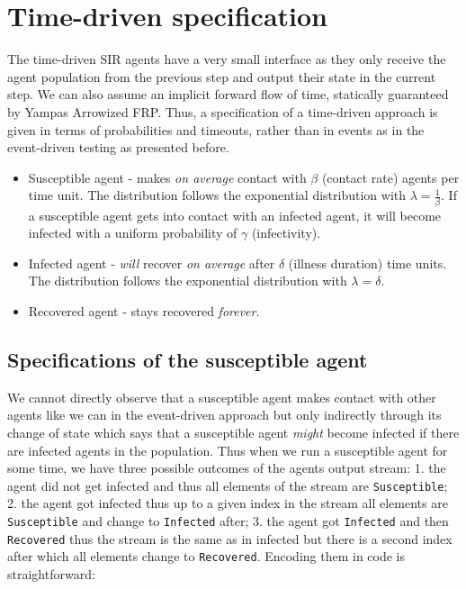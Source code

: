 \section{Time-driven specification}
\label{sec:timedriven_specification}
The time-driven SIR agents have a very small interface as they only receive the agent population from the previous step and output their state in the current step. We can also assume an implicit forward flow of time, statically guaranteed by Yampas Arrowized FRP. Thus, a specification of a time-driven approach is given in terms of probabilities and timeouts, rather than in events as in the event-driven testing as presented before.

\begin{itemize}
	\item Susceptible agent - makes \textit{on average} contact with $\beta$ (contact rate) agents per time unit. The distribution follows the exponential distribution with $\lambda = \frac{1}{\beta}$. If a susceptible agent gets into contact with an infected agent, it will become infected with a uniform probability of $\gamma$ (infectivity).
	
	\item Infected agent - \textit{will} recover \textit{on average} after $\delta$ (illness duration) time units. The distribution follows the exponential distribution with $\lambda = \delta$.

	\item Recovered agent - stays recovered \textit{forever}.
\end{itemize}

\subsection{Specifications of the susceptible agent}
We cannot directly observe that a susceptible agent makes contact with other agents like we can in the event-driven approach but only indirectly through its change of state which says that a susceptible agent \textit{might} become infected if there are infected agents in the population.
Thus when we run a susceptible agent for some time, we have three possible outcomes of the agents output stream: 1. the agent did not get infected and thus all elements of the stream are \texttt{Susceptible}; 2. the agent got infected thus up to a given index in the stream all elements are \texttt{Susceptible} and change to \texttt{Infected} after; 3. the agent got \texttt{Infected} and then \texttt{Recovered} thus the stream is the same as in infected but there is a second index after which all elements change to \texttt{Recovered}. Encoding them in code is straightforward:

